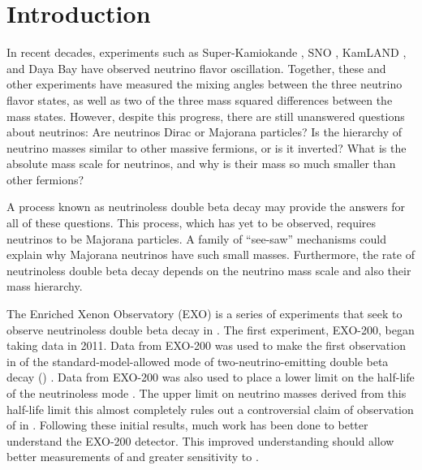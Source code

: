 \documentclass[herrin-thesis.tex]{subfiles}
\begin{document}
\chapter{Introduction}

In recent decades, experiments such as Super-Kamiokande \cite{Fukuda:1998zr}, SNO \cite{Ahmad:2001ys}, KamLAND \cite{PhysRevLett.90.021802}, and Daya Bay \cite{PhysRevLett.108.171803} have observed neutrino flavor oscillation. Together, these and other experiments have measured the mixing angles between the three neutrino flavor states, as well as two of the three mass squared differences between the mass states. However, despite this progress, there are still unanswered questions about neutrinos: Are neutrinos Dirac or Majorana particles? Is the hierarchy of neutrino masses similar to other massive fermions, or is it inverted? What is the absolute mass scale for neutrinos, and why is their mass so much smaller than other fermions?

A process known as neutrinoless double beta decay may provide the answers for all of these questions. This process, which has yet to be observed, requires neutrinos to be Majorana particles. A family of ``see-saw'' mechanisms could explain why Majorana neutrinos have such small masses. Furthermore, the rate of neutrinoless double beta decay depends on the neutrino mass scale and also their mass hierarchy.

The Enriched Xenon Observatory (EXO) is a series of experiments that seek to observe neutrinoless double beta decay in . The first experiment, EXO-200, began taking data in 2011. Data from EXO-200 was used to make the first observation in  of the standard-model-allowed mode of two-neutrino-emitting double beta decay (\twonu) \cite{Ackerman:2011gz}. Data from EXO-200 was also used to place a lower limit on the half-life of the neutrinoless mode \cite{Auger:2012ar}. The upper limit on neutrino masses derived from this half-life limit this almost completely rules out a controversial claim of observation of \zeronu{} in  \cite{KlapdorKleingrothaus:2006ff}. Following these initial results, much work has been done to better understand the EXO-200 detector. This improved understanding should allow better measurements of \twonu{} and greater sensitivity to \zeronu{}.
\end{document}
